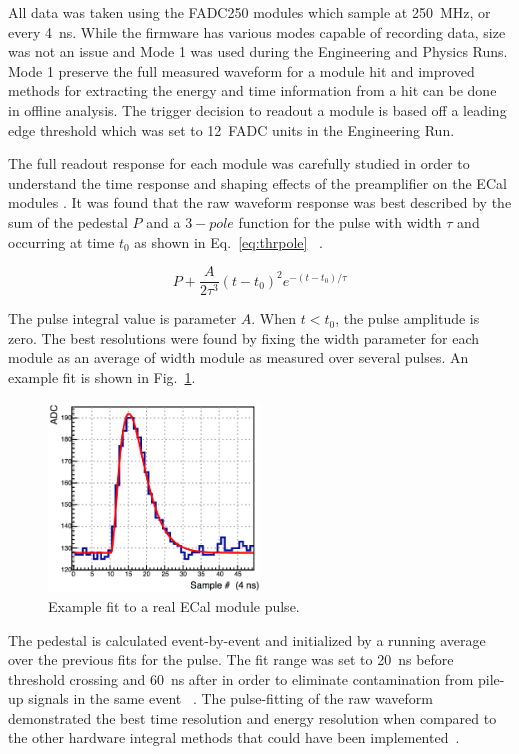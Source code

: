 All data was taken using the FADC250 modules which sample at 250~MHz, or every 4~ns. While the firmware has various modes capable of recording data, size was not an issue and Mode 1 was used during the Engineering and Physics Runs. Mode 1 preserve the full measured waveform for a module hit and improved methods for extracting the energy and time information from a hit can be done in offline analysis. The trigger decision to readout a module is based off a leading edge threshold which was set to 12~FADC units in the Engineering Run. 

The full readout response for each module was carefully studied in order to understand the time response and shaping effects of the preamplifier on the ECal modules \cite{Charles}. It was found that the raw waveform response was best described by the sum of the pedestal $P$ and a $3-pole$ function for the pulse with width $\tau$ and occurring at time $t_0$ as shown in Eq.~\eqref{eq:thrpole} ~\cite{Charles}.

\begin{equation}
	\label{eq:thrpole}
	P + \dfrac{A}{2\tau^3}(t-t_0)^2e^{-(t-t_0)/\tau} 
\end{equation}

The pulse integral value is parameter $A$. When $t<t_0$, the pulse amplitude is zero. The best resolutions were found by fixing the width parameter for each module as an average of width module as measured over several pulses. An example fit is shown in Fig.~\ref{Figure:mode1fit}.

\begin{figure}[H]
  \centering
      \includegraphics[width=0.5\textwidth]{pics/performance/mode1fit.png}
  \caption[Pulse-fitting to Mode 1 ECal data]{Example fit to a real ECal module pulse.}
  \label{Figure:mode1fit}
\end{figure}

The pedestal is calculated event-by-event and initialized by a running average over the previous fits for the pulse. The fit range was set to 20~ns before threshold crossing and 60~ns after in order to eliminate contamination from pile-up signals in the same event ~\cite{Baltzell}. The pulse-fitting of the raw waveform demonstrated the best time resolution and energy resolution when compared to the other hardware integral methods that could have been implemented~\cite{Baltzell}.
